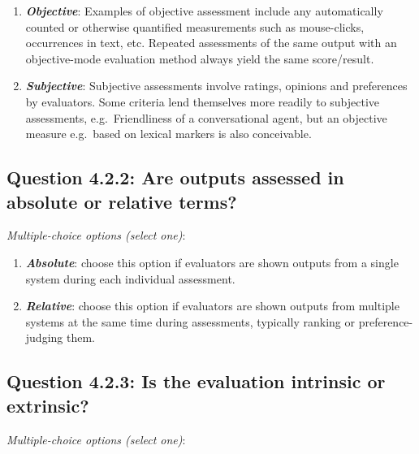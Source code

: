 \documentclass[11pt,a4paper]{article}
\newcommand{\egcvalue}[1]{\textbf{\textit{#1}}}
\begin{document}
\begin{enumerate}[itemsep=0cm,leftmargin=0.5cm,label={\LARGE $\circ$}]
    \item \egcvalue{Objective}: Examples of objective assessment include any automatically counted or otherwise quantified measurements such as mouse-clicks, occurrences in text, etc. Repeated assessments of the same output with an objective-mode evaluation method always yield the same score/result.
    \item \egcvalue{Subjective}: Subjective assessments involve ratings, opinions and preferences by evaluators. Some criteria lend themselves more readily to subjective assessments, e.g.\ Friendliness of a conversational agent, but an objective measure e.g.\ based on lexical markers is also conceivable.
\end{enumerate}
    
\subsection*{Question 4.2.2: Are outputs assessed in absolute or relative terms?}
\vspace{-.1cm}

\vspace{.3cm}
\noindent\textit{Multiple-choice options (select one)}:  
\vspace{-.1cm}

\begin{enumerate}[itemsep=0cm,leftmargin=0.5cm,label={\LARGE $\circ$}]
    \item \egcvalue{Absolute}: choose this option if evaluators are shown outputs from a single system during each individual assessment. 
    \item \egcvalue{Relative}: choose this option if evaluators are shown outputs from multiple systems at the same time during assessments, typically ranking or preference-judging them.
\end{enumerate}

\vspace{-.3cm}
\subsection*{Question 4.2.3: Is the evaluation intrinsic or extrinsic?}

\noindent\textit{Multiple-choice options (select one)}:  
\vspace{-.1cm}
\end{document}
